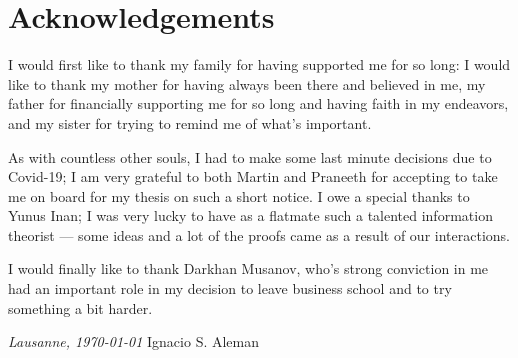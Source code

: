 \chapter*{Acknowledgements}
\vspace{0.2\textheight}

I would first like to thank my family for having supported me for so long:
I would like to thank my mother for having always been there and believed in me, 
my father for financially supporting me for so long and having faith in my endeavors, 
and my sister for trying to remind me of what's important.


As with countless other souls, I had to make some last minute decisions 
due to Covid-19; I am very grateful to both Martin and Praneeth for 
accepting to take me on board for my thesis on such a short notice. 
I owe a special thanks to Yunus Inan; I was very lucky to have as a 
flatmate such a talented information theorist --- some ideas and a lot 
of the proofs came as a result of our interactions.

I would finally like to thank Darkhan Musanov, who's strong conviction in me 
had an important role in my decision to leave business school and to try something 
a bit harder. 

\bigskip
 
\noindent\textit{Lausanne, \today}
\hfill Ignacio S. Aleman
